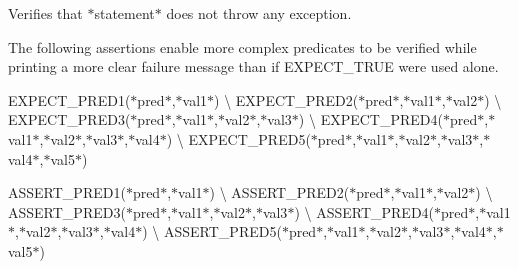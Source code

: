 Verifies that $\ast${\ttfamily statement}$\ast$ does not throw any exception.

The following assertions enable more complex predicates to be verified while printing a more clear failure message than if {\ttfamily E\+X\+P\+E\+C\+T\+\_\+\+T\+R\+UE} were used alone.

{\ttfamily E\+X\+P\+E\+C\+T\+\_\+\+P\+R\+E\+D1(}$\ast${\ttfamily pred}$\ast${\ttfamily ,}$\ast${\ttfamily val1}$\ast${\ttfamily )} \textbackslash{} {\ttfamily E\+X\+P\+E\+C\+T\+\_\+\+P\+R\+E\+D2(}$\ast${\ttfamily pred}$\ast${\ttfamily ,}$\ast${\ttfamily val1}$\ast${\ttfamily ,}$\ast${\ttfamily val2}$\ast${\ttfamily )} \textbackslash{} {\ttfamily E\+X\+P\+E\+C\+T\+\_\+\+P\+R\+E\+D3(}$\ast${\ttfamily pred}$\ast${\ttfamily ,}$\ast${\ttfamily val1}$\ast${\ttfamily ,}$\ast${\ttfamily val2}$\ast${\ttfamily ,}$\ast${\ttfamily val3}$\ast${\ttfamily )} \textbackslash{} {\ttfamily E\+X\+P\+E\+C\+T\+\_\+\+P\+R\+E\+D4(}$\ast${\ttfamily pred}$\ast${\ttfamily ,}$\ast${\ttfamily val1}$\ast${\ttfamily ,}$\ast${\ttfamily val2}$\ast${\ttfamily ,}$\ast${\ttfamily val3}$\ast${\ttfamily ,}$\ast${\ttfamily val4}$\ast${\ttfamily )} \textbackslash{} {\ttfamily E\+X\+P\+E\+C\+T\+\_\+\+P\+R\+E\+D5(}$\ast${\ttfamily pred}$\ast${\ttfamily ,}$\ast${\ttfamily val1}$\ast${\ttfamily ,}$\ast${\ttfamily val2}$\ast${\ttfamily ,}$\ast${\ttfamily val3}$\ast${\ttfamily ,}$\ast${\ttfamily val4}$\ast${\ttfamily ,}$\ast${\ttfamily val5}$\ast${\ttfamily )}

{\ttfamily A\+S\+S\+E\+R\+T\+\_\+\+P\+R\+E\+D1(}$\ast${\ttfamily pred}$\ast${\ttfamily ,}$\ast${\ttfamily val1}$\ast${\ttfamily )} \textbackslash{} {\ttfamily A\+S\+S\+E\+R\+T\+\_\+\+P\+R\+E\+D2(}$\ast${\ttfamily pred}$\ast${\ttfamily ,}$\ast${\ttfamily val1}$\ast${\ttfamily ,}$\ast${\ttfamily val2}$\ast${\ttfamily )} \textbackslash{} {\ttfamily A\+S\+S\+E\+R\+T\+\_\+\+P\+R\+E\+D3(}$\ast${\ttfamily pred}$\ast${\ttfamily ,}$\ast${\ttfamily val1}$\ast${\ttfamily ,}$\ast${\ttfamily val2}$\ast${\ttfamily ,}$\ast${\ttfamily val3}$\ast${\ttfamily )} \textbackslash{} {\ttfamily A\+S\+S\+E\+R\+T\+\_\+\+P\+R\+E\+D4(}$\ast${\ttfamily pred}$\ast${\ttfamily ,}$\ast${\ttfamily val1}$\ast${\ttfamily ,}$\ast${\ttfamily val2}$\ast${\ttfamily ,}$\ast${\ttfamily val3}$\ast${\ttfamily ,}$\ast${\ttfamily val4}$\ast${\ttfamily )} \textbackslash{} {\ttfamily A\+S\+S\+E\+R\+T\+\_\+\+P\+R\+E\+D5(}$\ast${\ttfamily pred}$\ast${\ttfamily ,}$\ast${\ttfamily val1}$\ast${\ttfamily ,}$\ast${\ttfamily val2}$\ast${\ttfamily ,}$\ast${\ttfamily val3}$\ast${\ttfamily ,}$\ast${\ttfamily val4}$\ast${\ttfamily ,}$\ast${\ttfamily val5}$\ast${\ttfamily )}

